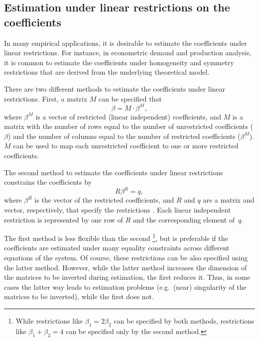\subsection{Estimation under linear restrictions on the coefficients}
\label{sec:Restrictions}

In many empirical applications,
it is desirable to estimate the coefficients under linear restrictions.
For instance, in econometric demand and production analysis,
it is common to estimate the coefficients
under homogeneity and symmetry restrictions
that are derived from the underlying theoretical model.

There are two different methods to estimate the coefficients
under linear restrictions.
First, a matrix $M$ can be specified that
\begin{equation}
   \beta = M \cdot \beta^M \label{eq:T-restr} ,
\end{equation}
where $\beta^M$ is a vector of restricted (linear independent) coefficients,
and $M$ is a matrix with the number of rows equal to the number of
unrestricted coefficients ($\beta$) and
the number of columns equal to the number of restricted coefficients
($\beta^M$).
$M$ can be used to map each unrestricted coefficient to one or more
restricted coefficients.

The second method to estimate the coefficients under linear restrictions
constrains the coefficients by
\begin{equation}
   R \beta^R = q ,
   \label{eq:restr-R}
\end{equation}
where $\beta^R$ is the vector of the restricted coefficients,
and $R$ and $q$ are a matrix and vector, respectively,
that specify the restrictions \citep[see][p.~100]{greene03}.
Each linear independent restriction is represented by one row of $R$
and the corresponding element of~$q$.

The first method is less flexible than the second%
\footnote{
While restrictions like $\beta_1 = 2 \beta_2$ can be specified by
both methods,
restrictions like $\beta_1 + \beta_2 = 4$ can be specified only
by the second method.
}, 
but is preferable if the coefficients are estimated
under many equality constraints across different equations of the system.
Of course, these restrictions can be also specified using
the latter method.
However, while the latter method increases the dimension of the 
matrices to be inverted during estimation, the first reduces it. 
Thus, in some cases the latter way leads to estimation problems
(e.g.\ (near) singularity of the matrices to be inverted),
while the first does not.

